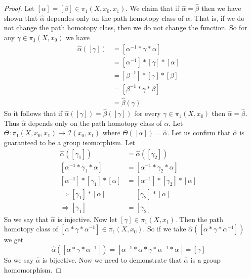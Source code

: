 \documentclass{article}
\theoremstyle{definition}
\begin{document}
        \begin{proof}
            Let $[\alpha] = [\beta] \in \pi_1(X,x_0,x_1)$. We claim that if $\hat \alpha = \hat \beta$ then we have shown that $\hat \alpha$
            dependes only on the path homotopy class of $\alpha$. That is, if we do not change the path homotopy class, then we do not change the function.
            So for any $\gamma \in \pi_1(X,x_0)$ we have
            \begin{align*}
                \hat \alpha([\gamma]) &= [\alpha^{-1} * \gamma * \alpha] \\
                &= [\alpha^{-1}] * [\gamma] * [\alpha] \\
                &= [\beta^{-1}] * [\gamma] * [\beta] \\
                &= [\beta^{-1} * \gamma * \beta] \\
                &= \hat \beta(\gamma)
            \end{align*}
            So it follows that if $\hat \alpha([\gamma]) = \hat \beta([\gamma])$ for every $\gamma \in \pi_1(X,x_0)$ then 
            $\hat \alpha = \hat \beta$. Thus $\hat \alpha$ depends only on the path homotopy class of $\alpha$.
            Let $\Theta : \pi_1(X,x_0,x_1) \rightarrow \mathcal I(x_0,x_1)$ where $\Theta([\alpha]) = \hat \alpha$.
            Let us confirm that $\hat \alpha$ is guaranteed to be a group isomorphism. Let 
            \begin{align*}
                \hat\alpha([\gamma_1]) &= \hat\alpha([\gamma_2])\\
                [\alpha^{-1} * \gamma_1 * \alpha]  & =  [\alpha^{-1} * \gamma_2 * \alpha] \\
                [\alpha^{-1}] * [\gamma_1] * [\alpha] & = [\alpha^{-1}] * [\gamma_2] * [\alpha]\\
                \Longrightarrow [\gamma_1] * [\alpha] & = [\gamma_2] * [\alpha]\\
                \Longrightarrow [\gamma_1]  & = [\gamma_2] 
            \end{align*}
            So we say that $\hat \alpha$ is injective. Now let $[\gamma] \in \pi_1(X,x_1)$.
            Then the path homotopy class of $[\alpha * \gamma * \alpha^{-1}] \in \pi_1(X,x_0)$.
            So if we take $\hat\alpha([\alpha * \gamma * \alpha^{-1}])$ we get 
            \[
                \hat\alpha([\alpha * \gamma * \alpha^{-1}])  = [\alpha^{-1} * \alpha * \gamma * \alpha^{-1} * \alpha]   = [\gamma]
            \]
            So we say $\hat\alpha$ is bijective. Now we need to demonstrate that $\hat \alpha$ is a group homomorphism.

\end{proof}
\end{document}
